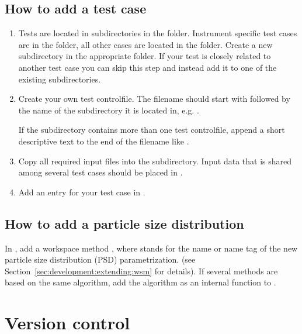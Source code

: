 \subsection{How to add a test case}
\begin{enumerate}
\item Tests are located in subdirectories in the 
  folder. Instrument specific test cases are in the
   folder, all other cases are
  located in the  folder. Create
  a new subdirectory in the appropriate folder. If your test is closely
  related to another test case you can skip this step and instead add it
  to one of the existing subdirectories.
\item Create your own test controlfile. The filename should start
  with  followed by the name
  of the subdirectory it is located in, e.g.
  .

  If the subdirectory contains more than one test controlfile,
  append a short descriptive text to the end of the filename like
  .
\item Copy all required input files into the subdirectory. Input data that is
  shared among several test cases should be placed in
  .
\item Add an entry for your test case in
  .
\end{enumerate}


\subsection{How to add a particle size distribution}
In , add a workspace method , where
 stands for the name or name tag of the new particle size
distribution (PSD) parametrization. (see Section~\ref{sec:development:extending:wsm}
for details). If several  methods are based on the same 
algorithm, add the algorithm as an internal function to .


\section{Version control}
\label{sec:development:cvs}

